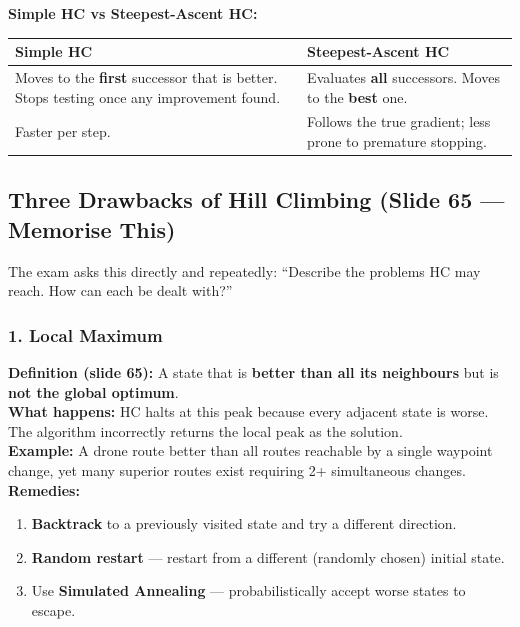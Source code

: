 \documentclass[12pt, a4paper]{article}
\newenvironment{solutionbox}{\begin{mdframed}[style=solutionframe]}{\end{mdframed}}
\begin{document}
\vspace{0.4em}

\noindent\textbf{Simple HC vs Steepest-Ascent HC:}
\begin{center}
\renewcommand{\arraystretch}{1.4}
\begin{tabular}{p{6cm}|p{6cm}}
\toprule
\textbf{Simple HC} & \textbf{Steepest-Ascent HC} \\
\midrule
Moves to the \textbf{first} successor that is better. Stops testing once any improvement found. & Evaluates \textbf{all} successors. Moves to the \textbf{best} one. \\
Faster per step. & Follows the true gradient; less prone to premature stopping. \\
\bottomrule
\end{tabular}
\end{center}

\subsection{Three Drawbacks of Hill Climbing (Slide 65 — Memorise This)}

\begin{solutionbox}
The exam asks this directly and repeatedly: ``Describe the problems HC may reach. How can each be dealt with?''
\end{solutionbox}

\vspace{0.5em}

\subsubsection*{1. Local Maximum}

\noindent\textbf{Definition (slide 65):} A state that is \textbf{better than all its neighbours} but is \textbf{not the global optimum}.\\[0.2em]
\textbf{What happens:} HC halts at this peak because every adjacent state is worse. The algorithm incorrectly returns the local peak as the solution.\\[0.2em]
\textbf{Example:} A drone route better than all routes reachable by a single waypoint change, yet many superior routes exist requiring 2+ simultaneous changes.\\[0.2em]
\textbf{Remedies:}
\begin{enumerate}[noitemsep]
  \item \textbf{Backtrack} to a previously visited state and try a different direction.
  \item \textbf{Random restart} — restart from a different (randomly chosen) initial state.
  \item Use \textbf{Simulated Annealing} — probabilistically accept worse states to escape.
\end{enumerate}
\end{document}
